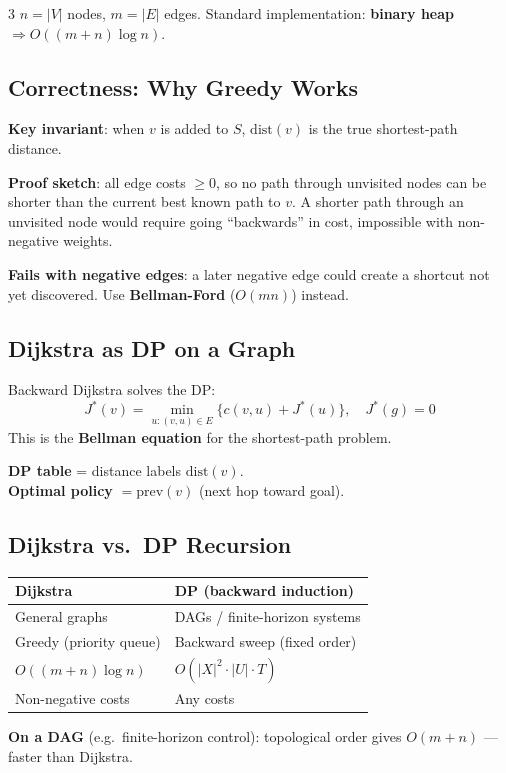 \documentclass[9pt,landscape]{article}
\begin{document}
\begin{multicols}{3}
\vspace{4pt}
$n=|V|$ nodes, $m=|E|$ edges. Standard implementation: \textbf{binary heap} $\Rightarrow O((m+n)\log n)$.

\subsection{Correctness: Why Greedy Works}
\textbf{Key invariant}: when $v$ is added to $S$, $\mathrm{dist}(v)$ is the true shortest-path distance.

\textbf{Proof sketch}: all edge costs $\ge0$, so no path through unvisited nodes can be shorter than the current best known path to $v$. A shorter path through an unvisited node would require going ``backwards'' in cost, impossible with non-negative weights.

\textbf{Fails with negative edges}: a later negative edge could create a shortcut not yet discovered. Use \textbf{Bellman-Ford} ($O(mn)$) instead.

\subsection{Dijkstra as DP on a Graph}
Backward Dijkstra solves the DP:
\[\boxed{J^*(v)=\min_{u:(v,u)\in E}\{c(v,u)+J^*(u)\},\quad J^*(g)=0}\]
This is the \textbf{Bellman equation} for the shortest-path problem.

\textbf{DP table} = distance labels $\mathrm{dist}(v)$.\\
\textbf{Optimal policy} $= \mathrm{prev}(v)$ (next hop toward goal).

\subsection{Dijkstra vs.\ DP Recursion}
\begin{tabular}{@{}p{2cm}p{3.6cm}@{}}
\toprule
\textbf{Dijkstra} & \textbf{DP (backward induction)}\\
\midrule
General graphs & DAGs / finite-horizon systems\\
Greedy (priority queue) & Backward sweep (fixed order)\\
$O((m+n)\log n)$ & $O(|X|^2\cdot|U|\cdot T)$\\
Non-negative costs & Any costs\\
\bottomrule
\end{tabular}

\vspace{4pt}
\textbf{On a DAG} (e.g.\ finite-horizon control): topological order gives $O(m+n)$ --- faster than Dijkstra.


\end{multicols}
\end{document}
